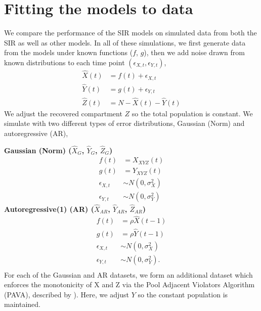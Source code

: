 \documentclass[12pt]{article}
\begin{document}

\section{Fitting the models to data}\label{sec:sim-res}

We compare the performance of the SIR models on simulated data from both the SIR as well as other models. In all of these simulations, we first generate data from the models under known functions ($f$, $g$), then we add noise drawn from known distributions to each time point $(\epsilon_{X,t}, \epsilon_{Y,t})$,
\begin{align}\label{eq:sim-models}
  \hat{X}(t) &= f(t) + \epsilon_{X,t} \\
  \hat{Y}(t) &= g(t) + \epsilon_{Y,t} \nonumber\\
  \hat{Z}(t) &= N - \hat{X}(t) - \hat{Y}(t)\nonumber 
\end{align}
We adjust the recovered compartment $Z$ so the total population is constant. 
We simulate with two different types of error distributions, Gaussian (Norm) and autoregressive (AR),

\noindent \textbf{Gaussian (Norm) ($\hat{X}_{G}$, $\hat{Y}_{G}$, $\hat{Z}_{G}$)}
\begin{align*}
  f(t) &= X_{XYZ}(t) \\
  g(t) &= Y_{XYZ}(t) \\
  \epsilon_{X,t} &\sim N(0, \sigma_X^2) \\
  \epsilon_{Y,t} &\sim N(0, \sigma_Y^2)
\end{align*}
\textbf{Autoregressive(1) (AR) ($\hat{X}_{AR}$, $\hat{Y}_{AR}$, $\hat{Z}_{AR}$)}
\begin{align*}
  f(t) &= \rho \hat{X}(t-1) \\
  g(t) &= \rho \hat{Y}(t-1) \\
  \epsilon_{X,t} &\sim N(0, \sigma_X^2) \\
  \epsilon_{Y,t} &\sim N(0, \sigma_Y^2).\\
\end{align*}
For each of the Gaussian and AR datasets, we form an additional dataset which enforces the monotonicity of X and Z via the Pool Adjacent Violators Algorithm (PAVA), described by \cite{friedman1984}).  Here, we adjust $Y$ so the constant population is maintained.
\end{document}
